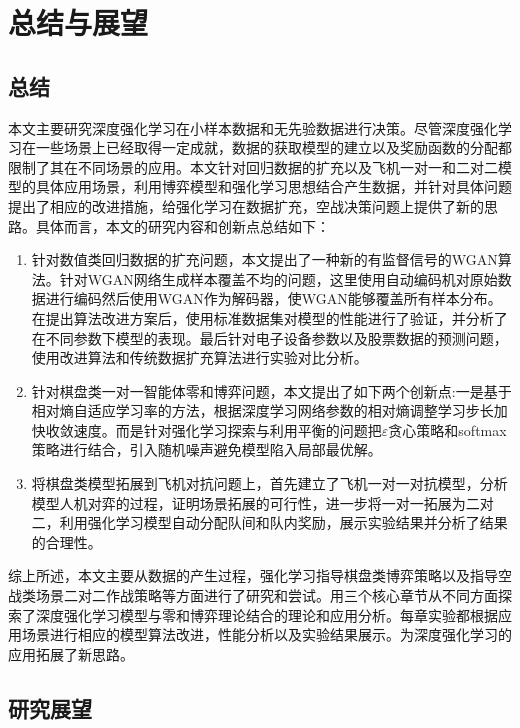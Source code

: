 \chapter{总结与展望}
\section{总结}
本文主要研究深度强化学习在小样本数据和无先验数据进行决策。尽管深度强化学习在一些场景上已经取得一定成就，数据的获取模型的建立以及奖励函数的分配都限制了其在不同场景的应用。本文针对回归数据的扩充以及飞机一对一和二对二模型的具体应用场景，利用博弈模型和强化学习思想结合产生数据，并针对具体问题提出了相应的改进措施，给强化学习在数据扩充，空战决策问题上提供了新的思路。{\tiny }具体而言，本文的研究内容和创新点总结如下：
\begin{enumerate}
	\item  针对数值类回归数据的扩充问题，本文提出了一种新的有监督信号的WGAN算法。针对WGAN网络生成样本覆盖不均的问题，这里使用自动编码机对原始数据进行编码然后使用WGAN作为解码器，使WGAN能够覆盖所有样本分布。在提出算法改进方案后，使用标准数据集对模型的性能进行了验证，并分析了在不同参数下模型的表现。最后针对电子设备参数以及股票数据的预测问题，使用改进算法和传统数据扩充算法进行实验对比分析。
	\item 针对棋盘类一对一智能体零和博弈问题，本文提出了如下两个创新点:一是基于相对熵自适应学习率的方法，根据深度学习网络参数的相对熵调整学习步长加快收敛速度。而是针对强化学习探索与利用平衡的问题把$\varepsilon$贪心策略和softmax策略进行结合，引入随机噪声避免模型陷入局部最优解。
	\item 将棋盘类模型拓展到飞机对抗问题上，首先建立了飞机一对一对抗模型，分析模型人机对弈的过程，证明场景拓展的可行性，进一步将一对一拓展为二对二，利用强化学习模型自动分配队间和队内奖励，展示实验结果并分析了结果的合理性。
\end{enumerate}

综上所述，本文主要从数据的产生过程，强化学习指导棋盘类博弈策略以及指导空战类场景二对二作战策略等方面进行了研究和尝试。用三个核心章节从不同方面探索了深度强化学习模型与零和博弈理论结合的理论和应用分析。每章实验都根据应用场景进行相应的模型算法改进，性能分析以及实验结果展示。为深度强化学习的应用拓展了新思路。

\section{研究展望}

